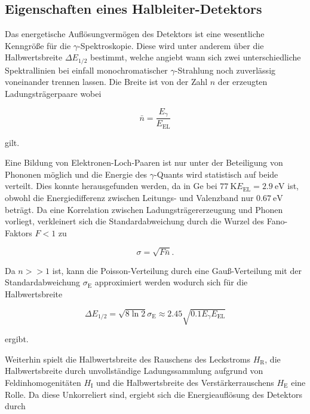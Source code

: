 \FloatBarrier
\subsection{Eigenschaften eines Halbleiter-Detektors} %
\label{sec:eigenschaften_eines_halbleiter_detektors}

Das energetische Auflösungvermögen des Detektors ist eine wesentliche Kenngröße für die $\gamma$-Spektroskopie.
Diese wird unter anderem über die Halbwertsbreite $\Delta E_\text{1/2}$ bestimmt, welche angiebt wann sich zwei unterschiedliche Spektrallinien bei einfall monochromatischer $\gamma$-Strahlung noch zuverlässig voneinander trennen lassen.
Die Breite ist von der Zahl $n$ der erzeugten Ladungsträgerpaare wobei

\begin{equation}
	\bar{n} = \frac{E_\gamma}{E_\text{EL}}
\end{equation}

gilt.

Eine Bildung von Elektronen-Loch-Paaren ist nur unter der Beteiligung von Phononen möglich und die Energie des $\gamma$-Quants wird statistisch auf beide verteilt.
Dies konnte herausgefunden werden, da in Ge bei $\SI{77}{\kelvin} E_\text{EL} = \SI{2.9}{\electronvolt}$ ist, obwohl die Energiedifferenz zwischen Leitungs- und Valenzband nur $\SI{0.67}{\electronvolt}$ beträgt.
Da eine Korrelation zwischen Ladungsträgererzeugung und Phonen vorliegt, verkleinert sich die Standardabweichung durch die Wurzel des Fano-Faktors $F < 1$ zu

\begin{equation}
	\sigma = \sqrt{F \bar{n}} .
\end{equation}

Da $n >> 1$ ist, kann die Poisson-Verteilung durch eine Gauß-Verteilung mit der Standardabweichung $\sigma_\text{E}$ approximiert werden wodurch sich für die Halbwertsbreite 

\begin{equation}
	\Delta E_\text{1/2} = \sqrt{8 \ln{2}} \sigma_\text{E} \approx 2.45 \sqrt{0.1 E_\text{$\gamma$} E_\text{EL}}
\end{equation}

ergibt.

Weiterhin spielt die Halbwertsbreite des Rauschens des Leckstroms $H_\text{R}$, die Halbwertsbreite durch unvollständige Ladungssammlung aufgrund von Feldinhomogenitäten $H_\text{I}$ und die Halbwertsbreite des Verstärkerrauschens $H_\text{E}$ eine Rolle.
Da diese Unkorreliert sind, ergiebt sich die Energieauflösung des Detektors durch

